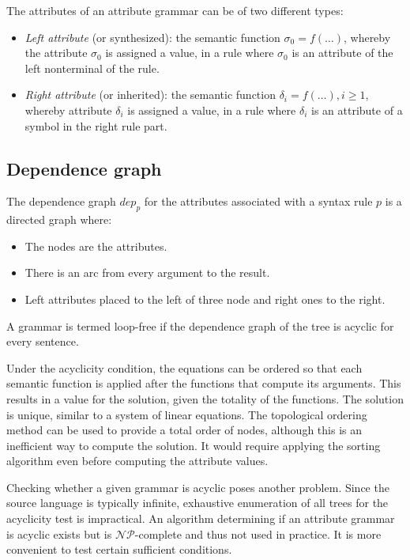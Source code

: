 The attributes of an attribute grammar can be of two different types: 
\begin{itemize}
    \item \textit{Left attribute} (or synthesized): the semantic function $\sigma_0=f(\dots)$, whereby the attribute $\sigma_0$ is assigned a value, in a rule where $\sigma_0$ is an attribute of the left nonterminal of the rule. 
    \item \textit{Right attribute} (or inherited):  the semantic function $\delta_i=f(\dots), i \geq 1$, whereby attribute $\delta_i$ is assigned a value, in a rule where $\delta_i$ is an attribute of a symbol in the right rule part. 
\end{itemize}

\subsection{Dependence graph}
The dependence graph $dep_p$ for the attributes associated with a syntax rule $p$ is a directed graph where: 
\begin{itemize}
    \item The nodes are the attributes. 
    \item There is an arc from every argument to the result. 
    \item Left attributes placed to the left of three node and right ones to the right. 
\end{itemize}

A grammar is termed loop-free if the dependence graph of the tree is acyclic for every sentence.

Under the acyclicity condition, the equations can be ordered so that each semantic function is applied after the functions that compute its arguments. 
This results in a value for the solution, given the totality of the functions. 
The solution is unique, similar to a system of linear equations. 
The topological ordering method can be used to provide a total order of nodes, although this is an inefficient way to compute the solution. 
It would require applying the sorting algorithm even before computing the attribute values.

Checking whether a given grammar is acyclic poses another problem. 
Since the source language is typically infinite, exhaustive enumeration of all trees for the acyclicity test is impractical. 
An algorithm determining if an attribute grammar is acyclic exists but is $\mathcal{NP}$-complete and thus not used in practice. 
It is more convenient to test certain sufficient conditions.

